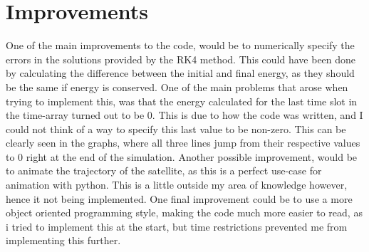 \documentclass[twocolumn, prl, nobalancelastpage, aps, citeautoscript, longbibliography, 10pt]{revtex4-1}
\begin{document}
\section{Improvements}
One of the main improvements to the code, would be to numerically specify the errors in the solutions provided by the RK4 method. This could have been done by calculating the difference between 
the initial and final energy, as they should be the same if energy is conserved. One of the main problems that arose when trying to implement this, was that
the energy calculated for the last time slot in the time-array turned out to be 0. This is due to how the code was written, and I could not
think of a way to specify this last value to be non-zero. This can be clearly seen in the graphs, where all three lines jump from their respective values
to 0 right at the end of the simulation. Another possible improvement, would be to animate the trajectory of the satellite, as this is a perfect
use-case for animation with python. This is a little outside my area of knowledge however, hence it not being implemented. One final improvement
could be to use a more object oriented programming style, making the code much more easier to read, as i tried to implement this at the start, but time restrictions prevented me from 
implementing this further. 
\end{document}
